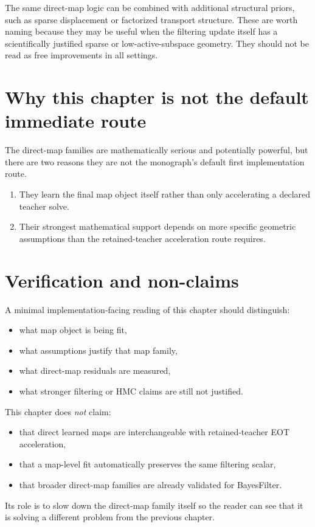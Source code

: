 The same direct-map logic can be combined with additional structural priors, such
as sparse displacement or factorized transport structure.  These are worth naming
because they may be useful when the filtering update itself has a scientifically
justified sparse or low-active-subspace geometry.  They should not be read as free
improvements in all settings.

\section{Why this chapter is not the default immediate route}
\label{sec:bf-neural-ot-direct-why-not-default}

The direct-map families are mathematically serious and potentially powerful, but
there are two reasons they are not the monograph’s default first implementation
route.
\begin{enumerate}[label=(\roman*)]
  \item They learn the final map object itself rather than only accelerating a
  declared teacher solve.
  \item Their strongest mathematical support depends on more specific geometric
  assumptions than the retained-teacher acceleration route requires.
\end{enumerate}

\section{Verification and non-claims}
\label{sec:bf-neural-ot-direct-verification}

A minimal implementation-facing reading of this chapter should distinguish:
\begin{itemize}
  \item what map object is being fit,
  \item what assumptions justify that map family,
  \item what direct-map residuals are measured,
  \item what stronger filtering or HMC claims are still not justified.
\end{itemize}

This chapter does \emph{not} claim:
\begin{itemize}
  \item that direct learned maps are interchangeable with retained-teacher EOT
  acceleration,
  \item that a map-level fit automatically preserves the same filtering scalar,
  \item that broader direct-map families are already validated for BayesFilter.
\end{itemize}
Its role is to slow down the direct-map family itself so the reader can see that
it is solving a different problem from the previous chapter.

\FloatBarrier
